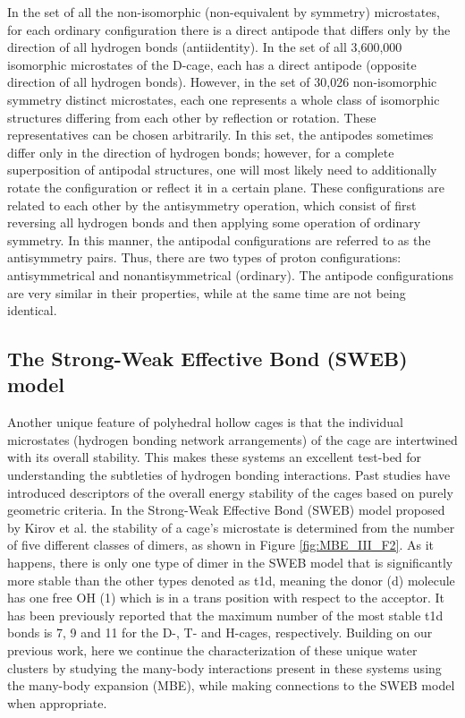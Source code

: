 \documentclass[11pt, proquest]{uwthesis}[2020/02/24]
\begin{document}
\par In the set of all the non-isomorphic (non-equivalent by symmetry) microstates, for each ordinary configuration there is a direct antipode that differs only by the direction of all hydrogen bonds (antiidentity). In the set of all 3,600,000 isomorphic microstates of the D-cage,\autocite{kirov_atlas_2002} each has a direct antipode (opposite direction of all hydrogen bonds). However, in the set of 30,026 non-isomorphic symmetry distinct microstates, each one represents a whole class of isomorphic structures differing from each other by reflection or rotation. These representatives can be chosen arbitrarily. In this set, the antipodes sometimes differ only in the direction of hydrogen bonds; however, for a complete superposition of antipodal structures, one will most likely need to additionally rotate the configuration or reflect it in a certain plane. These configurations are related to each other by the antisymmetry operation, which consist of first reversing all hydrogen bonds and then applying some operation of ordinary symmetry. In this manner, the antipodal configurations are referred to as the antisymmetry pairs. Thus, there are two types of proton configurations: antisymmetrical and nonantisymmetrical (ordinary). The antipode configurations are very similar in their properties, while at the same time are not being identical.

\subsection{The Strong-Weak Effective Bond (SWEB) model}



\par Another unique feature of polyhedral hollow cages is that the individual microstates (hydrogen bonding network arrangements) of the cage are  intertwined with its overall stability.\autocite{kuo_use_2001} This makes these systems an excellent test-bed for understanding the subtleties of hydrogen bonding interactions. Past studies have introduced descriptors of the overall energy stability of the cages based on purely geometric criteria. In the Strong-Weak Effective Bond (SWEB) model proposed by Kirov et al.\autocite{kirov_identifying_2008} the stability of a cage's microstate is determined from the number of five different classes of dimers, as shown in Figure \ref{fig:MBE_III_F2}. As it happens, there is only one type of dimer in the SWEB model that is significantly more stable than the other types denoted as t1d, meaning the donor (d) molecule has one free OH (1) which is in a trans position with respect to the acceptor. It has been previously reported that the maximum number of the most stable t1d bonds is 7, 9 and 11 for the D-, T- and H-cages, respectively. Building on our previous work,\autocite{kirov_identifying_2008,yoo_low-energy_2009} here we continue the characterization of these unique water clusters by studying the many-body interactions present in these systems using the many-body expansion (MBE),\autocite{xantheas_ab_1994,herbert_fantasy_2019} while making connections to the SWEB model when appropriate.
\end{document}
